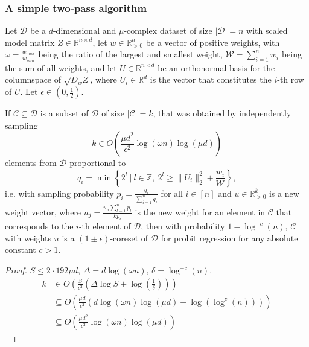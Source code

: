 

\subsubsection{A simple two-pass algorithm}

\begin{theorem}
    Let $\mathcal{D}$ be a $d$-dimensional and $\mu$-complex dataset of
    size $|\mathcal{D}|=n$ with scaled model matrix
    $Z \in \mathbb{R}^{n \times d}$, let $w \in \mathbb{R}^n_{>0}$ be
    a vector of positive weights, with
    $\omega = \frac{w_{max}}{w_{min}}$ being the ratio of the largest and
    smallest weight, $\mathcal{W} = \sum_{i=1}^n w_i$ being the
    sum of all weights, and let $U \in \mathbb{R}^{n \times d}$
    be an orthonormal basis for the columnspace of
    $\sqrt{D_wZ}$, where $U_i \in \mathbb{R}^d$ is the vector that
    constitutes the $i$-th row of $U$. Let
    $\epsilon \in (0, \frac{1}{2})$.

    If $\mathcal{C} \subseteq \mathcal{D}$ is a subset of $\mathcal{D}$
    of size $|\mathcal{C}| = k$, that was obtained by independently sampling
    \begin{equation*}
        k \in O\left(\frac{\mu d^2}{\epsilon^2} \log(\omega n) \log(\mu d)\right)
    \end{equation*}
    elements from $\mathcal{D}$ proportional to
    \begin{equation*}
        q_i = \min\left\{ 2^l\ |\ l \in \mathbb{Z},\  2^l \geq \lVert U_i \rVert_2^2 + \frac{w_i}{\mathcal{W}} \right\},
    \end{equation*}
    i.e. with sampling probability $p_i = \frac{q_i}{\sum_{i=1}^n q_i}$
    for all $i \in [n]$ and
    $u \in \mathbb{R}^k_{>0}$ is a new weight vector, where
    $u_j = \frac{w_i \sum_{l=1}^n p_l}{kp_i}$ is the new weight for
    an element in $\mathcal{C}$ that corresponds to the $i$-th element
    of $\mathcal{D}$,
    then with probability $1 - \log^{-c}(n)$, $\mathcal{C}$ with weights $u$
    is a $(1 \pm \epsilon)$-coreset of $\mathcal{D}$ for probit regression
    for any absolute constant $c > 1$.
\end{theorem}
\begin{proof}
    $S \leq 2 \cdot 192 \mu d$, $\Delta = d\log(\omega n)$, $\delta = \log^{-c}(n)$.
    \begin{align*}
        k & \in O\left( \frac{S}{\epsilon^2} \left(\Delta \log S + \log\left(\frac{1}{\delta}\right)\right)\right)                  \\
          & \subseteq O\left(\frac{\mu d}{\epsilon^2}\left(d \log(\omega n) \log(\mu d) + \log\left(\log^c(n)\right) \right)\right) \\
          & \subseteq O\left(\frac{\mu d^2}{\epsilon^2}\log(\omega n) \log(\mu d)\right)
    \end{align*}
\end{proof}
